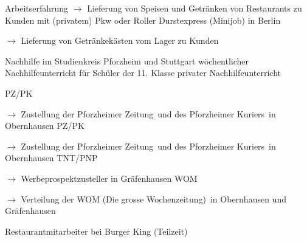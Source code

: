 \begin{rubric}{\textcolor{black!20!blue!100}{Arbeitserfahrung}}
				\setlength{\hangindent}{\widthof{$\rightarrow$ }}
				$\rightarrow$ Lieferung von Speisen und Getränken von Restaurants zu Kunden mit (privatem) Pkw oder Roller
			\entry*[17/07/2020 --- 18/10/2020]
				Durstexpress (Minijob) in Berlin
				
				\setlength{\hangindent}{\widthof{$\rightarrow$ }}
				$\rightarrow$ Lieferung von Getränkekästen vom Lager zu Kunden
					
			\entry*[10/2015 --- 01/2016]
				Nachhilfe im Studienkreis Pforzheim und Stuttgart
			\entry*[10/2011 --- 06/2012]
				wöchentlicher Nachhilfeunterricht für Schüler der 11. Klasse
			\entry*[\phantom{10/}2010 --- 2016]
				privater Nachhilfeunterricht
				
			\entry*[08/2015 --- 09/2015]
				PZ/PK
				
				\setlength{\hangindent}{\widthof{$\rightarrow$ }}
				$\rightarrow$ Zustellung der \glqq Pforzheimer Zeitung\grqq\ und des \glqq Pforzheimer Kuriers\grqq\ in Obernhausen
			\entry*[08/2012 --- 09/2012]
				PZ/PK
				
				\setlength{\hangindent}{\widthof{$\rightarrow$ }}
				$\rightarrow$ Zustellung der \glqq Pforzheimer Zeitung\grqq\ und des \glqq Pforzheimer Kuriers\grqq\ in Obernhausen
			\entry*[06/2009 --- 10/2010]
				TNT/PNP
				
				\setlength{\hangindent}{\widthof{$\rightarrow$ }}
				$\rightarrow$ Werbeprospektzusteller in Gräfenhausen
			\entry*[06/2007 --- 12/2008]
				WOM
				
				\setlength{\hangindent}{\widthof{$\rightarrow$ }}
				$\rightarrow$ Verteilung der \glqq WOM (Die grosse Wochenzeitung)\grqq\ in Obernhausen und Gräfenhausen
				
			\entry*[04/2012 --- 10/2012]
				Restaurantmitarbeiter bei Burger King (Teilzeit)
	\end{rubric}